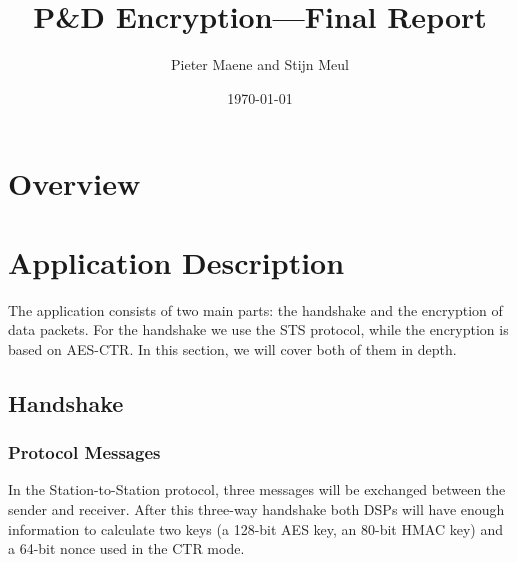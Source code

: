 \documentclass[a4paper]{article}
\title{P\&D Encryption---Final Report}
\author{Pieter Maene and Stijn Meul}
\date{\today}
\begin{document}

\maketitle

\section{Overview}

\section{Application Description}

The application consists of two main parts: the handshake and the encryption of data packets. For the handshake we use the STS protocol, while the encryption is based on AES-CTR. In this section, we will cover both of them in depth.

\subsection{Handshake}

\subsubsection{Protocol Messages}
In the Station-to-Station protocol, three messages will be exchanged between the sender and receiver. After this three-way handshake both DSPs will have enough information to calculate two keys (a 128-bit AES key, an 80-bit HMAC key) and a 64-bit nonce used in the CTR mode.
\end{document}
